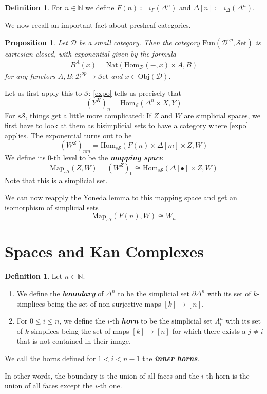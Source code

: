 \documentclass{article}
\newcommand{\textbi}[1]{\textbf{\textit{#1}}}
\newcommand{\D}{\mathscr{D}}
\newcommand{\bN}{\mathbb{N}}
\newcommand{\cS}{\mathcal{S}}
\newcommand{\Obj}{\mathrm{Obj}}
\newcommand{\Hom}{\mathrm{Hom}}
\newcommand{\Set}{\cS\mathrm{et}}
\newcommand{\sS}{s\cS}
\newcommand{\Fun}{\mathrm{Fun}}
\newcommand{\Map}{\mathrm{Map}}
\newcommand{\Nat}{\mathrm{Nat}}
\newtheorem{prop}[subsection]{Proposition}
\theoremstyle{definition}
\newtheorem{defin}[subsection]{Definition}
\begin{document}
\begin{defin}
    For $n\in\bN$ we define $F(n)\coloneqq i_F(\Delta^n)$ and $\Delta[n]\coloneqq  i_\Delta(\Delta^n)$.
\end{defin}

We now recall an important fact about presheaf categories.
\begin{prop}
    Let $\D$ be a small category. Then the category $\Fun(\D^{op}, \Set)$ is cartesian closed, with exponential given by the formula \begin{align}\label{expo}
        B^A(x)=\Nat(\Hom_{\D}(-,x)\times A, B)
    \end{align} for any functors $A,B:\D^{op}\to \Set$ and $x\in\Obj(\D)$.
\end{prop}

Let us first apply this to $\cS$: \ref{expo} tells us precisely that $$(Y^X)_n=\Hom_{\cS}(\Delta^n\times X, Y)$$
For $\sS$, things get a little more complicated: If $Z$ and $W$ are simplicial spaces, we first have to look at them as bisimplicial sets to have a category where \ref{expo} applies. The exponential turns out to be $$(W^Z)_{nm}=\Hom_{\sS}(F(n)\times\Delta[m]\times Z, W)$$
We define its $0$-th level to be the \textbi{mapping space} $$\Map_{\sS}(Z,W)=(W^Z)_0\cong \Hom_{\sS}(\Delta[\bullet]\times Z, W)$$ Note that this is a simplicial set.
\par We can now reapply the Yoneda lemma to this mapping space and get an isomorphism of simplicial sets $$\Map_{\sS}(F(n),W)\cong W_n$$

\section{Spaces and Kan Complexes}

\begin{defin}
    Let $n\in\bN$.
    \begin{enumerate}
        \item We define the \textbi{boundary} of $\Delta^n$ to be the simplicial set $\partial\Delta^n$ with its set of $k$-simplices being the set of non-surjective maps $[k]\to[n]$.
        \item For $0\leq i\leq n$, we define the $i$-th \textbi{horn} to be the simplicial set $\Lambda^n_i$ with its set of $k$-simplices being the set of maps $[k]\to[n]$ for which there exists a $j\ne i$ that is not contained in their image.
    \end{enumerate}
    We call the horns defined for $1<i<n-1$ the \textbi{inner horns}.
\end{defin}
In other words, the boundary is the union of all faces and the $i$-th horn is the union of all faces except the $i$-th one.
\end{document}
